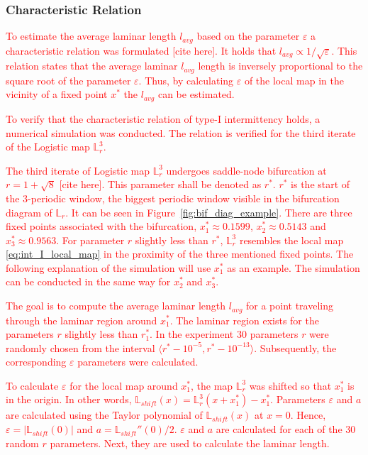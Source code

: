 \subsubsection{Characteristic Relation}
\textcolor{red}{
To estimate the average laminar length $l_{avg}$ based on the parameter $\varepsilon$ a characteristic relation was formulated [cite here].
It holds that $l_{avg} \propto 1/\sqrt{\varepsilon}$.
This relation states that the average laminar $l_{avg}$ length is inversely proportional to the square root of the parameter $\varepsilon$.
Thus, by calculating $\varepsilon$ of the local map in the vicinity of a fixed point $x^{*}$ the $l_{avg}$ can be estimated.
}
\par
\textcolor{red}{
To verify that the characteristic relation of type-I intermittency holds, a numerical simulation was conducted.
The relation is verified for the third iterate of the Logistic map $\mathbb{L}_{r}^{3}$.
}
\par
\textcolor{red}{
The third iterate of Logistic map $\mathbb{L}_{r}^{3}$ undergoes saddle-node bifurcation at $r = 1+\sqrt{8}$ [cite here].
This parameter shall be denoted as $r^{*}$.
$r^{*}$ is the start of the $3$-periodic window, the biggest periodic window visible in the bifurcation diagram of $\mathbb{L}_{r}$.
It can be seen in Figure~\ref{fig:bif_diag_example}.
There are three fixed points associated with the bifurcation, $x^{*}_{1} \approx 0.1599$, $x^{*}_{2} \approx 0.5143$ and $x^{*}_{3} \approx 0.9563$.
For parameter $r$ slightly less than $r^{*}$, $\mathbb{L}_{r}^{3}$ resembles the local map \ref{eq:int_I_local_map} in the proximity of the three mentioned fixed points.
The following explanation of the simulation will use $x^{*}_{1}$ as an example.
The simulation can be conducted in the same way for $x^{*}_{2}$ and $x^{*}_{3}$.
}
\par
\textcolor{red}{
The goal is to compute the average laminar length $l_{avg}$ for a point traveling through the laminar region around $x^{*}_{1}$.
The laminar region exists for the parameters $r$ slightly less than $r^{*}_{1}$.
In the experiment $30$ parameters $r$ were randomly chosen from the interval $\langle r^{*}-10^{-5}, r^{*}-10^{-13} \rangle$.
Subsequently, the corresponding $\varepsilon$ parameters were calculated.
}
\par
\textcolor{red}{
To calculate $\varepsilon$ for the local map around $x^{*}_{1}$, the map $\mathbb{L}_{r}^{3}$ was shifted so that $x^{*}_{1}$ is in the origin.
In other words, $\mathbb{L}_{shift}(x) = \mathbb{L}_{r}^{3}(x + x^{*}_{1}) - x^{*}_{1}$.
Parameters $\varepsilon$ and $a$ are calculated using the Taylor polynomial of $\mathbb{L}_{shift}(x)$ at $x = 0$.
Hence, $\varepsilon = | \mathbb{L}_{shift}(0) |$ and $a = \mathbb{L}_{shift}''(0) / 2$.
$\varepsilon$ and $a$ are calculated for each of the $30$ random $r$ parameters.
Next, they are used to calculate the laminar length.
}
